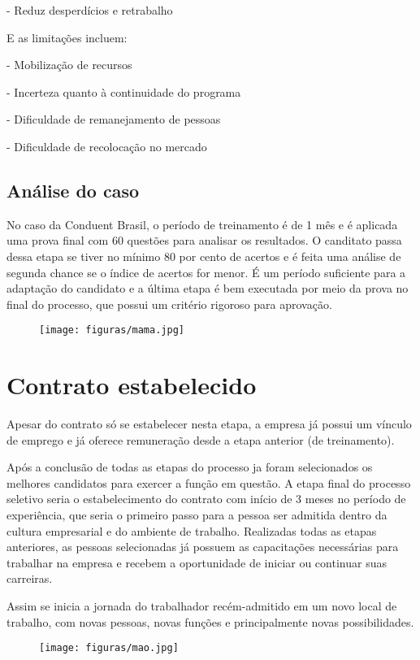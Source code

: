 - Reduz desperdícios e retrabalho

E as limitações incluem:

- Mobilização de recursos

- Incerteza quanto à continuidade do programa

- Dificuldade de remanejamento de pessoas

- Dificuldade de recolocação no mercado




\section{Análise do caso}
No caso da Conduent Brasil, o período de treinamento é de 1 mês e é aplicada uma prova final com 60 questões para analisar os resultados. O canditato passa dessa etapa se tiver no mínimo 80 por cento de acertos e é feita uma análise de segunda chance se o índice de acertos for menor. É um período suficiente para a adaptação do candidato e a última etapa é bem executada por meio da prova no final do processo, que possui um critério rigoroso para aprovação.

\begin{figure}[h]

\centering
\texttt{[image: figuras/mama.jpg]}
\end{figure}
\chapter{Contrato estabelecido}
Apesar do contrato só se estabelecer nesta etapa, a empresa já possui um vínculo de emprego e já oferece remuneração desde a etapa anterior (de treinamento).

Após a conclusão de todas as etapas do processo ja foram selecionados os melhores candidatos para exercer a função em questão. A etapa final do processo seletivo seria o estabelecimento do contrato com início de 3 meses no período de experiência, que seria o primeiro passo para a pessoa ser admitida dentro da cultura empresarial e do ambiente de trabalho. Realizadas todas as etapas anteriores, as pessoas selecionadas já possuem as capacitações necessárias para trabalhar na empresa e recebem a oportunidade de iniciar ou continuar suas carreiras.

Assim se inicia a jornada do trabalhador recém-admitido em um novo local de trabalho, com novas pessoas, novas funções e principalmente novas possibilidades.

\begin{figure}[h]

\centering
\texttt{[image: figuras/mao.jpg]}
\end{figure}






